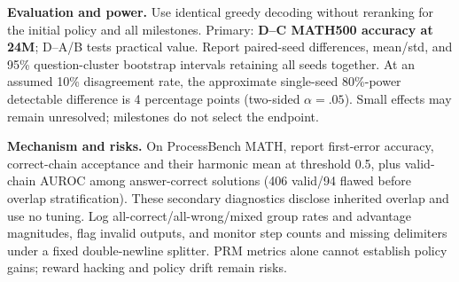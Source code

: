 \documentclass{article}
\begin{document}
\textbf{Evaluation and power.} Use identical greedy decoding without reranking for the initial policy and all milestones. Primary: \textbf{D--C MATH500 accuracy at 24M}; D--A/B tests practical value. Report paired-seed differences, mean/std, and 95\% question-cluster bootstrap intervals retaining all seeds together. At an assumed 10\% disagreement rate, the approximate single-seed 80\%-power detectable difference is 4 percentage points (two-sided $\alpha=.05$). Small effects may remain unresolved; milestones do not select the endpoint.

\textbf{Mechanism and risks.} On ProcessBench MATH, report first-error accuracy, correct-chain acceptance and their harmonic mean at threshold 0.5, plus valid-chain AUROC among answer-correct solutions (406 valid/94 flawed before overlap stratification). These secondary diagnostics disclose inherited overlap and use no tuning. Log all-correct/all-wrong/mixed group rates and advantage magnitudes, flag invalid outputs, and monitor step counts and missing delimiters under a fixed double-newline splitter. PRM metrics alone cannot establish policy gains; reward hacking and policy drift remain risks.
\end{document}
